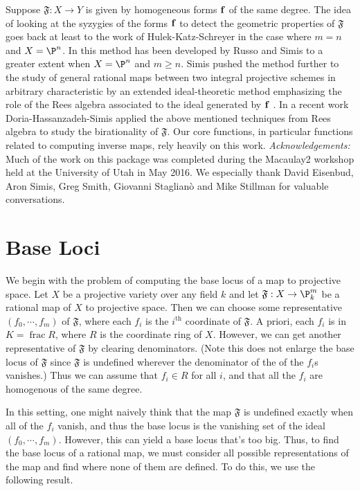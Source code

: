 \documentclass[11pt]{amsart}
\numberwithin{equation}{theorem}
\def\ff{{\bf f}}
\renewcommand{\:}{\colon}
\DeclareMathOperator{\ffield}{frac} %
\theoremstyle{theorem}
\begin{document}
Suppose $\mathfrak{F} : X \to Y$ is given by homogeneous forms $\ff$ of the same degree.
The idea of looking at the syzygies of the forms $\ff$ to detect the geometric properties of  $\mathfrak{F}$ goes
back at least to the work of Hulek-Katz-Schreyer \cite{HulekKatzSchreyer} in the case
where $m=n$ and $X=\P^n$. In \cite{RussoSimisCompositio}  this method has been developed by Russo and Simis
to a greater extent when $X=\P^n$ and $m\geq n$. Simis pushed the method further to the study
of general rational maps between two integral projective schemes in
arbitrary characteristic by an extended ideal-theoretic method
emphasizing the role of the Rees algebra associated to the ideal
generated by $\ff$ \cite{SimisCremona}.  In a recent work Doria-Hassanzadeh-Simis \cite{DoriaHassanzadehSimisBirationality} applied the above mentioned
 techniques from Rees algebra to study the birationality of  $\mathfrak{F}$.  Our core functions, in particular functions related to computing inverse maps, rely heavily on this work.
\vskip 12pt
\noindent
\emph{Acknowledgements:}  Much of the work  on this package was completed during the Macaulay2 workshop held at the University of Utah in May 2016.  We especially thank David Eisenbud, Aron Simis, Greg Smith, Giovanni Staglian\`o and Mike Stillman for valuable conversations.



\section{Base Loci}
We begin with the problem of computing the base locus of a map to projective space. Let $X$ be a projective variety over any field $k$ and let $\mathfrak{F}: X \to \P_k^m$ be a rational map of $X$ to projective space. Then we can choose some representative $(f_0, \cdots, f_m)$ of $\mathfrak{F}$, where each $f_i$ is the $i^{\textrm{th}}$ coordinate of $\mathfrak{F}$. A priori, each $f_i$ is in $K = \ffield R$, where $R$ is the coordinate ring of $X$. However, we can get another representative of $\mathfrak{F}$ by clearing denominators. (Note this does not enlarge the base locus of $\mathfrak{F}$ since $\mathfrak{F}$ is undefined wherever the denominator of the of the $f_i$s vanishes.) Thus we can assume that $f_i\in R$ for all $i$, and that all the $f_i$ are homogenous of the same degree.

In this setting, one might naively think that the map $\mathfrak{F}$ is undefined exactly when all of the $f_i$ vanish, and thus the base locus is the vanishing set of the ideal $(f_0, \cdots, f_m)$. However, this can yield a base locus that's too big.  Thus, to find the base locus of a rational map, we must consider all possible representations of the map and find where none of them are defined. To do this, we use the following result.
\end{document}
